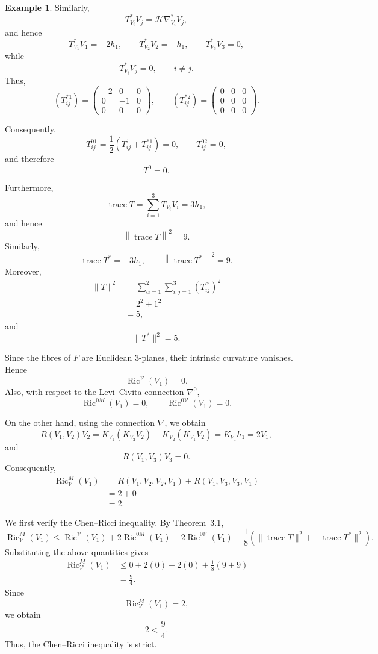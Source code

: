\documentclass[10pt,a4paper]{article}
\theoremstyle{definition}
\newtheorem{example}[theorem]{Example}
\theoremstyle{remark}
\numberwithin{equation}{section}
\begin{document}
\begin{example}
Similarly,
\[
T^{*}_{V_{i}}V_{j}
=
\mathcal{H}\nabla^{*}_{V_{i}}V_{j},
\]
and hence
\[
T^{*}_{V_{1}}V_{1}=-2h_{1},
\qquad
T^{*}_{V_{2}}V_{2}=-h_{1},
\qquad
T^{*}_{V_{3}}V_{3}=0,
\]
while
\[
T^{*}_{V_{i}}V_{j}=0,
\qquad i\neq j.
\]
Thus,
\[
\left(T^{*1}_{ij}\right)
=
\begin{pmatrix}
-2&0&0\\
0&-1&0\\
0&0&0
\end{pmatrix},
\qquad
\left(T^{*2}_{ij}\right)
=
\begin{pmatrix}
0&0&0\\
0&0&0\\
0&0&0
\end{pmatrix}.
\]

Consequently,
\[
T^{01}_{ij}
=
\frac12
\left(
T^{1}_{ij}+T^{*1}_{ij}
\right)
=0,
\qquad
T^{02}_{ij}=0,
\]
and therefore
\[
T^{0}=0.
\]

Furthermore,
\[
\operatorname{trace}T
=
\sum_{i=1}^{3}T_{V_i}V_i
=
3h_{1},
\]
and hence
\[
\left\|\operatorname{trace}T\right\|^{2}=9.
\]
Similarly,
\[
\operatorname{trace}T^{*}
=
-3h_{1},
\qquad
\left\|\operatorname{trace}T^{*}\right\|^{2}=9.
\]
Moreover,
\[
\begin{aligned}
\|T\|^{2}
&=
\sum_{\alpha=1}^{2}
\sum_{i,j=1}^{3}
\left(T^{\alpha}_{ij}\right)^{2}\\
&=
2^{2}+1^{2}\\
&=5,
\end{aligned}
\]
and
\[
\|T^{*}\|^{2}=5.
\]

Since the fibres of $F$ are Euclidean $3$-planes, their intrinsic
curvature vanishes. Hence
\[
\operatorname{Ric}^{\mathcal V}(V_{1})=0.
\]
Also, with respect to the Levi--Civita connection $\nabla^{0}$,
\[
\operatorname{Ric}^{0M}(V_{1})=0,
\qquad
\operatorname{Ric}^{0\mathcal V}(V_{1})=0.
\]

On the other hand, using the connection $\nabla$, we obtain
\[
R(V_{1},V_{2})V_{2}
=
K_{V_{1}}(K_{V_{2}}V_{2})
-
K_{V_{2}}(K_{V_{1}}V_{2})
=
K_{V_{1}}h_{1}
=
2V_{1},
\]
and
\[
R(V_{1},V_{3})V_{3}=0.
\]
Consequently,
\[
\begin{aligned}
\operatorname{Ric}^{M}_{\mathcal V}(V_{1})
&=
R(V_{1},V_{2},V_{2},V_{1})
+
R(V_{1},V_{3},V_{3},V_{1})\\
&=2+0\\
&=2.
\end{aligned}
\]

We first verify the Chen--Ricci inequality. By Theorem~3.1,
\[
\operatorname{Ric}^{M}_{\mathcal V}(V_{1})
\leq
\operatorname{Ric}^{\mathcal V}(V_{1})
+
2\operatorname{Ric}^{0M}(V_{1})
-
2\operatorname{Ric}^{0\mathcal V}(V_{1})
+
\frac18
\left(
\|\operatorname{trace}T\|^{2}
+
\|\operatorname{trace}T^{*}\|^{2}
\right).
\]
Substituting the above quantities gives
\[
\begin{aligned}
\operatorname{Ric}^{M}_{\mathcal V}(V_{1})
&\leq
0+2(0)-2(0)
+\frac18(9+9)\\
&=\frac94.
\end{aligned}
\]
Since
\[
\operatorname{Ric}^{M}_{\mathcal V}(V_{1})=2,
\]
we obtain
\[
\boxed{
2<\frac94.
}
\]
Thus, the Chen--Ricci inequality is strict.


\end{example}
\end{document}
